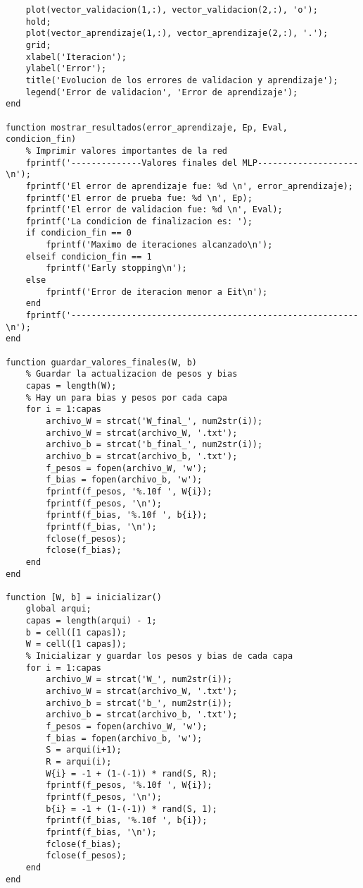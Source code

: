 \begin{lstlisting}
    plot(vector_validacion(1,:), vector_validacion(2,:), 'o');
    hold;
    plot(vector_aprendizaje(1,:), vector_aprendizaje(2,:), '.');
    grid;
    xlabel('Iteracion');
    ylabel('Error');
    title('Evolucion de los errores de validacion y aprendizaje');
    legend('Error de validacion', 'Error de aprendizaje');
end

function mostrar_resultados(error_aprendizaje, Ep, Eval, condicion_fin)
    % Imprimir valores importantes de la red
    fprintf('--------------Valores finales del MLP--------------------\n');
    fprintf('El error de aprendizaje fue: %d \n', error_aprendizaje);
    fprintf('El error de prueba fue: %d \n', Ep);
    fprintf('El error de validacion fue: %d \n', Eval);
    fprintf('La condicion de finalizacion es: ');
    if condicion_fin == 0
        fprintf('Maximo de iteraciones alcanzado\n');
    elseif condicion_fin == 1
        fprintf('Early stopping\n');
    else
        fprintf('Error de iteracion menor a Eit\n');
    end
    fprintf('---------------------------------------------------------\n');
end

function guardar_valores_finales(W, b)
    % Guardar la actualizacion de pesos y bias
    capas = length(W);
    % Hay un para bias y pesos por cada capa
    for i = 1:capas
        archivo_W = strcat('W_final_', num2str(i));
        archivo_W = strcat(archivo_W, '.txt');
        archivo_b = strcat('b_final_', num2str(i));
        archivo_b = strcat(archivo_b, '.txt');
        f_pesos = fopen(archivo_W, 'w');
        f_bias = fopen(archivo_b, 'w');
        fprintf(f_pesos, '%.10f ', W{i});
        fprintf(f_pesos, '\n');
        fprintf(f_bias, '%.10f ', b{i});
        fprintf(f_bias, '\n');
        fclose(f_pesos);
        fclose(f_bias);
    end
end

function [W, b] = inicializar()
    global arqui;
    capas = length(arqui) - 1;
    b = cell([1 capas]);
    W = cell([1 capas]);
    % Inicializar y guardar los pesos y bias de cada capa
    for i = 1:capas
        archivo_W = strcat('W_', num2str(i));
        archivo_W = strcat(archivo_W, '.txt');
        archivo_b = strcat('b_', num2str(i));
        archivo_b = strcat(archivo_b, '.txt');
        f_pesos = fopen(archivo_W, 'w');
        f_bias = fopen(archivo_b, 'w');
        S = arqui(i+1);
        R = arqui(i);
        W{i} = -1 + (1-(-1)) * rand(S, R);
        fprintf(f_pesos, '%.10f ', W{i});
        fprintf(f_pesos, '\n');
        b{i} = -1 + (1-(-1)) * rand(S, 1);
        fprintf(f_bias, '%.10f ', b{i});
        fprintf(f_bias, '\n');
        fclose(f_bias);
        fclose(f_pesos);
    end
end


\end{lstlisting}
